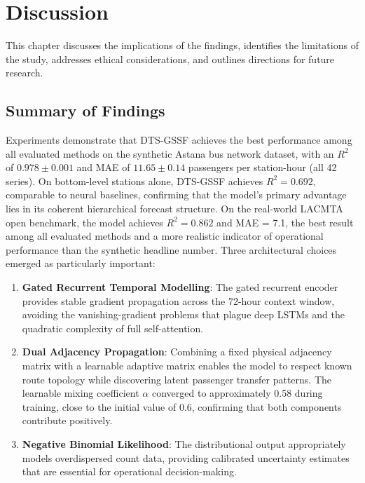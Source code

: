 %
%
\chapter{Discussion}
\label{chap:discussion}
\setlength{\parskip}{1em}

This chapter discusses the implications of the findings, identifies the limitations of the study, addresses ethical considerations, and outlines directions for future research.

\section{Summary of Findings}
\label{sec:findings}

Experiments demonstrate that DTS-GSSF achieves the best performance among all evaluated methods on the synthetic Astana bus network dataset, with an $R^2$ of $0.978 \pm 0.001$ and MAE of $11.65 \pm 0.14$ passengers per station-hour (all 42 series). On bottom-level stations alone, DTS-GSSF achieves $R^2 = 0.692$, comparable to neural baselines, confirming that the model's primary advantage lies in its coherent hierarchical forecast structure. On the real-world LACMTA open benchmark, the model achieves $R^2 = 0.862$ and MAE = 7.1, the best result among all evaluated methods and a more realistic indicator of operational performance than the synthetic headline number. Three architectural choices emerged as particularly important:

\begin{enumerate}
    \item \textbf{Gated Recurrent Temporal Modelling}: The gated recurrent encoder provides stable gradient propagation across the 72-hour context window, avoiding the vanishing-gradient problems that plague deep LSTMs and the quadratic complexity of full self-attention.
    \item \textbf{Dual Adjacency Propagation}: Combining a fixed physical adjacency matrix with a learnable adaptive matrix enables the model to respect known route topology while discovering latent passenger transfer patterns. The learnable mixing coefficient $\alpha$ converged to approximately 0.58 during training, close to the initial value of 0.6, confirming that both components contribute positively.
    \item \textbf{Negative Binomial Likelihood}: The distributional output appropriately models overdispersed count data, providing calibrated uncertainty estimates that are essential for operational decision-making.
\end{enumerate}

